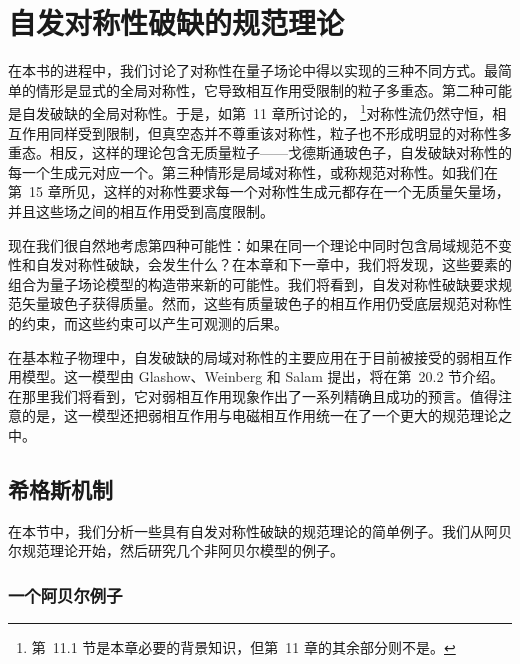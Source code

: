 \chapter{自发对称性破缺的规范理论}

在本书的进程中，我们讨论了对称性在量子场论中得以实现的三种不同方式。最简单的情形是显式的全局对称性，它导致相互作用受限制的粒子多重态。第二种可能是自发破缺的全局对称性。于是，如第~11 章所讨论的，%
\footnote{第~11.1 节是本章必要的背景知识，但第~11 章的其余部分则不是。}对称性流仍然守恒，相互作用同样受到限制，但真空态并不尊重该对称性，粒子也不形成明显的对称性多重态。相反，这样的理论包含无质量粒子——戈德斯通玻色子，自发破缺对称性的每一个生成元对应一个。第三种情形是局域对称性，或称规范对称性。如我们在第~15 章所见，这样的对称性要求每一个对称性生成元都存在一个无质量矢量场，并且这些场之间的相互作用受到高度限制。

现在我们很自然地考虑第四种可能性：如果在同一个理论中同时包含局域规范不变性和自发对称性破缺，会发生什么？在本章和下一章中，我们将发现，这些要素的组合为量子场论模型的构造带来新的可能性。我们将看到，自发对称性破缺要求规范矢量玻色子获得质量。然而，这些有质量玻色子的相互作用仍受底层规范对称性的约束，而这些约束可以产生可观测的后果。

在基本粒子物理中，自发破缺的局域对称性的主要应用在于目前被接受的弱相互作用模型。这一模型由 Glashow、Weinberg 和 Salam 提出，将在第~20.2 节介绍。在那里我们将看到，它对弱相互作用现象作出了一系列精确且成功的预言。值得注意的是，这一模型还把弱相互作用与电磁相互作用统一在了一个更大的规范理论之中。

\section{希格斯机制}

在本节中，我们分析一些具有自发对称性破缺的规范理论的简单例子。我们从阿贝尔规范理论开始，然后研究几个非阿贝尔模型的例子。

\subsection{一个阿贝尔例子}

